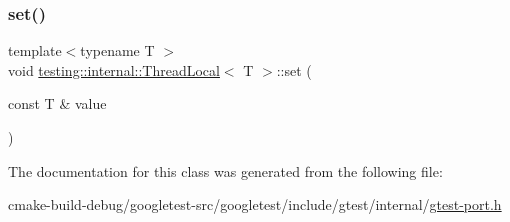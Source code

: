 \subsubsection{\texorpdfstring{set()}{set()}}
{\footnotesize\ttfamily template$<$typename T $>$ \\
void \mbox{\hyperlink{classtesting_1_1internal_1_1ThreadLocal}{testing\+::internal\+::\+Thread\+Local}}$<$ T $>$\+::set (\begin{DoxyParamCaption}\item[{const T \&}]{value }\end{DoxyParamCaption})\hspace{0.3cm}{\ttfamily [inline]}}



The documentation for this class was generated from the following file\+:\begin{DoxyCompactItemize}
\item 
cmake-\/build-\/debug/googletest-\/src/googletest/include/gtest/internal/\mbox{\hyperlink{gtest-port_8h}{gtest-\/port.\+h}}\end{DoxyCompactItemize}
